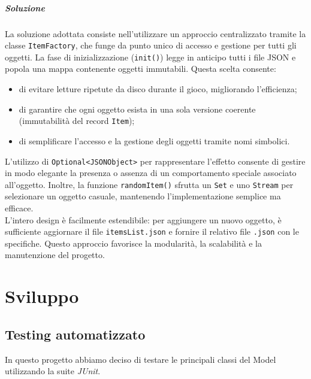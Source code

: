 \documentclass[a4paper,12pt]{report}
\begin{document}
{{\paragraph{Soluzione}
La soluzione adottata consiste nell’utilizzare un approccio centralizzato tramite la classe \texttt{ItemFactory}, che funge da punto unico di accesso e gestione per tutti gli oggetti. La fase di inizializzazione (\texttt{init()}) legge in anticipo tutti i file JSON e popola una mappa contenente oggetti immutabili. Questa scelta consente:
\begin{itemize}
\item di evitare letture ripetute da disco durante il gioco, migliorando l’efficienza;
\item di garantire che ogni oggetto esista in una sola versione coerente (immutabilità del record \texttt{Item});
\item di semplificare l’accesso e la gestione degli oggetti tramite nomi simbolici.
\end{itemize}
L’utilizzo di \texttt{Optional<JSONObject>} per rappresentare l’effetto consente di gestire in modo elegante la presenza o assenza di un comportamento speciale associato all’oggetto. Inoltre, la funzione \texttt{randomItem()} sfrutta un \texttt{Set} e uno \texttt{Stream} per selezionare un oggetto casuale, mantenendo l’implementazione semplice ma efficace.\\
L’intero design è facilmente estendibile: per aggiungere un nuovo oggetto, è sufficiente aggiornare il file \texttt{itemsList.json} e fornire il relativo file \texttt{.json} con le specifiche. Questo approccio favorisce la modularità, la scalabilità e la manutenzione del progetto.










\chapter{Sviluppo}

\section{Testing automatizzato}
In questo progetto abbiamo deciso di testare le principali classi del Model utilizzando la suite \textit{JUnit}.

}}
\end{document}
